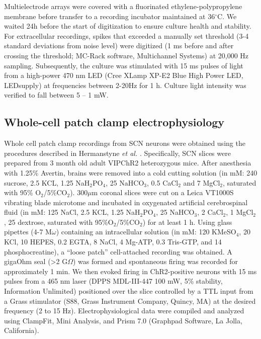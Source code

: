 Multielectrode arrays were covered with a fluorinated ethylene-polypropylene membrane before transfer to a recording incubator maintained at 36$^\circ$C.
We waited 24h before the start of digitization to ensure culture health and stability.
For extracellular recordings, spikes that exceeded a manually set threshold (3-4 standard deviations from noise level) were digitized (1 ms before and after crossing the threshold; MC-Rack software, Multichannel Systems) at 20,000 Hz sampling.
Subsequently, the culture was stimulated with 15 ms pulses of light from a high-power 470 nm LED (Cree XLamp XP-E2 Blue High Power LED, LEDsupply) at frequencies between 2-20Hz for 1 h. Culture light intensity was verified to fall between 5 – 1 mW. 

\subsection*{Whole-cell patch clamp electrophysiology}
Whole cell patch clamp recordings from SCN neurons were obtained using the procedures described in Hermanstyne \textit{et al.} \cite{Hermanstyne2016}.
Specifically, SCN slices were prepared from 3 month old adult VIPChR2 heterozygous mice. After anesthesia with 1.25\% Avertin, brains were removed into a cold cutting solution (in mM: 240 sucrose, 2.5 KCL, 1.25 NaH$_2$PO$_4$, 25 NaHCO$_3$, 0.5 CaCl$_2$ and 7 MgCl$_2$, saturated with 95\% O$_2$/5\%CO$_2$). 
300$\mu$m coronal slices were cut on a Leica VT1000S vibrating blade microtome and incubated in oxygenated artificial cerebrospinal fluid (in mM: 125 NaCl, 2.5 KCL, 1.25 NaH$_2$PO$_4$, 25 NaHCO$_3$, 2 CaCl$_2$, 1 MgCl$_2$, 25 dextrose, saturated with 95\%O$_2$/5\%CO$_2$) for at least 1 h.
Using glass pipettes (4-7 M$\omega$) containing an intracellular solution (in mM: 120 KMeSO$_4$, 20 KCl, 10 HEPES, 0.2 EGTA, 8 NaCl, 4 Mg-ATP, 0.3 Tris-GTP, and 14 phosphocreatine), a ``loose patch'' cell-attached recording was obtained.
A gigaOhm seal (>2 G$\Omega$) was formed and spontaneous firing was recorded for approximately 1 min.
We then evoked firing in ChR2-positive neurons with 15 ms pulses from a 465 nm laser (DPPS MDL-III-447 100 mW, 5\% stability, Information Unlimited) positioned over the slice controlled by a TTL input from a Grass stimulator (S88, Grass Instrument Company, Quincy, MA) at the desired frequency (2 to 15 Hz).
Electrophysiological data were compiled and analyzed using ClampFit, Mini Analysis, and Prism 7.0 (Graphpad Software, La Jolla, California).

